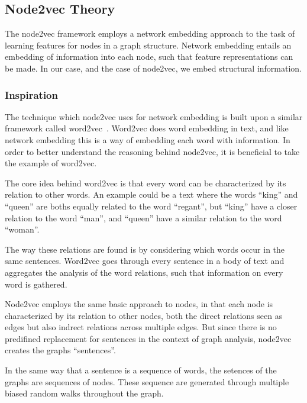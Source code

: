 \subsection{Node2vec Theory}\label{sec:node2vec}
The node2vec framework employs a network embedding approach to the task of learning features for nodes in a graph structure. Network embedding entails an embedding of information into each node, such that feature representations can be made. In our case, and the case of node2vec, we embed structural information.

\subsubsection{Inspiration}
The technique which node2vec uses for network embedding is built upon a similar framework called word2vec~\cite{}. Word2vec does word embedding in text, and like network embedding this is a way of embedding each word with information. In order to better understand the reasoning behind node2vec, it is beneficial to take the example of word2vec.

The core idea behind word2vec is that every word can be characterized by its relation to other words. An example could be a text where the words \enquote{king} and \enquote{queen} are boths equally related to the word \enquote{regant}, but \enquote{king} have a closer relation to the word \enquote{man}, and \enquote{queen} have a similar relation to the word \enquote{woman}.

The way these relations are found is by considering which words occur in the same sentences. Word2vec goes through every sentence in a body of text and aggregates the analysis of the word relations, such that information on every word is gathered.

Node2vec employs the same basic approach to nodes, in that each node is characterized by its relation to other nodes, both the direct relations seen as edges but also indrect relations across multiple edges. But since there is no predifined replacement for sentences in the context of graph analysis, node2vec creates the graphs \enquote{sentences}.

In the same way that a sentence is a sequence of words, the setences of the graphs are sequences of nodes. These sequence are generated through multiple biased random walks throughout the graph.

